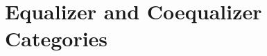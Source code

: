 \documentclass{book}
\begin{document}
	
	
	
	
	
	
	
	
	
	
	
	
	
	
	
	
	
	
	
	
	
	
	
	
	
	
	
	
	
	
	
	
	
	
	
	
	
	
	
	
	
	
	
	
	\section{Equalizer and Coequalizer Categories}
	
	
	
	
	
	
	
	
	
	
	
	
	
	
	
	
	
	
	
	
	
	
	
	
	
	
	
	
	
	
	
	
	
	
	
	
	
	
	
	
	
	
	
	
	
	
	
	
	
	
	
	
	
	
	
	
	
	
	
	
	
	
	
	
	
\end{document}
